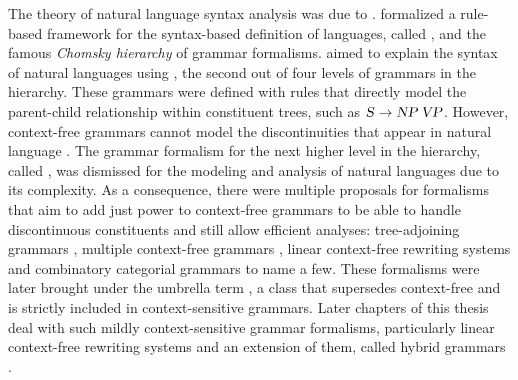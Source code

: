 \documentclass[../document.tex]{subfiles}
\begin{document}
    The theory of natural language syntax analysis was due to \citet{Cho56}.
     formalized a rule-based framework for the syntax-based definition of languages, called , and the famous \emph{Chomsky hierarchy} of grammar formalisms.
     aimed to explain the syntax of natural languages using , the second out of four levels of grammars in the hierarchy.
    These grammars were defined with rules that directly model the parent-child relationship within constituent trees, such as \(\textsc{\textsl{S}} \to \textsc{\textsl{NP}}\,\textsc{\textsl{VP}}\).
    However, context-free grammars cannot model the discontinuities that appear in natural language \citep{Shieber85}.
    The grammar formalism for the next higher level in the hierarchy, called , was dismissed for the modeling and analysis of natural languages due to its complexity.
    As a consequence, there were multiple proposals for formalisms that aim to add just power to context-free grammars to be able to handle discontinuous constituents and still allow efficient analyses:
        tree-adjoining grammars \citep{JosLevTak75}, multiple context-free grammars \citep{SekMatFujKas91}, linear context-free rewriting systems \citep{VijWeiJos87} and combinatory categorial grammars \citep{Ste11} to name a few.
    These formalisms were later brought under the umbrella term , a class that supersedes context-free and is strictly included in context-sensitive grammars.
    Later chapters of this thesis deal with such mildly context-sensitive grammar formalisms, particularly linear context-free rewriting systems and an extension of them, called hybrid grammars \citep{Ned14}.
\end{document}
